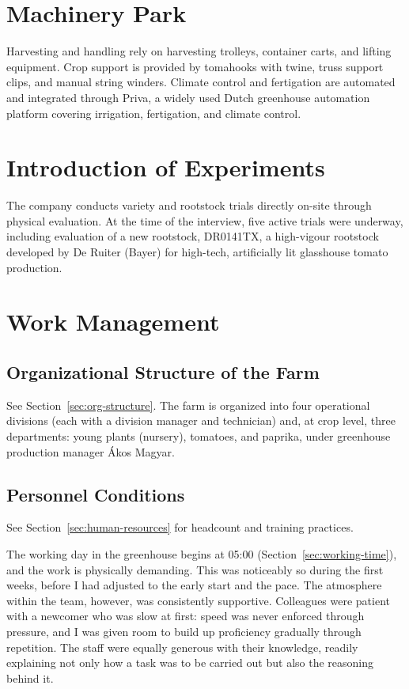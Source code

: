 \section{Machinery Park}
\label{sec:machinery}
Harvesting and handling rely on harvesting trolleys, container carts, and lifting equipment. Crop support is provided by tomahooks with twine, truss support clips, and manual string winders. Climate control and fertigation are automated and integrated through Priva, a widely used Dutch greenhouse automation platform covering irrigation, fertigation, and climate control.

\section{Introduction of Experiments}
\label{sec:experiments}
The company conducts variety and rootstock trials directly on-site through physical evaluation. At the time of the interview, five active trials were underway, including evaluation of a new rootstock, DR0141TX, a high-vigour rootstock developed by De Ruiter (Bayer) for high-tech, artificially lit glasshouse tomato production.

\section{Work Management}

\subsection{Organizational Structure of the Farm}
See Section~\ref{sec:org-structure}. The farm is organized into four operational divisions (each with a division manager and technician) and, at crop level, three departments: young plants (nursery), tomatoes, and paprika, under greenhouse production manager Ákos Magyar.

\subsection{Personnel Conditions}
See Section~\ref{sec:human-resources} for headcount and training practices.

The working day in the greenhouse begins at 05:00 (Section~\ref{sec:working-time}), and the work is physically demanding. This was noticeably so during the first weeks, before I had adjusted to the early start and the pace. The atmosphere within the team, however, was consistently supportive. Colleagues were patient with a newcomer who was slow at first: speed was never enforced through pressure, and I was given room to build up proficiency gradually through repetition. The staff were equally generous with their knowledge, readily explaining not only how a task was to be carried out but also the reasoning behind it.

